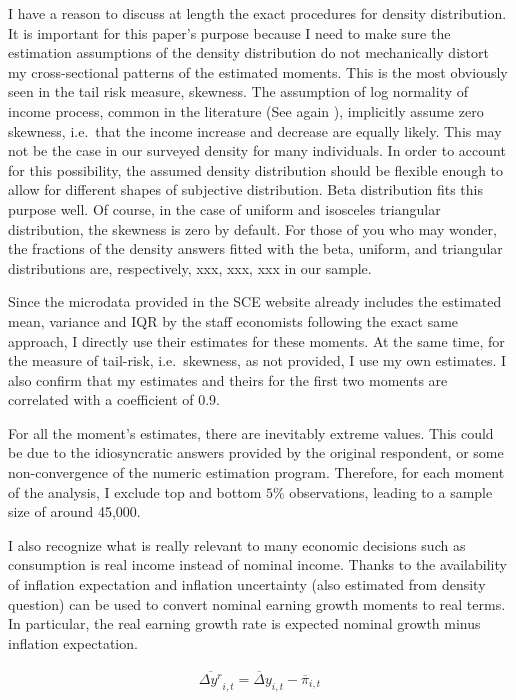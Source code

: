 \documentclass[12pt,notitlepage,onecolumn,aps,pra]{revtex4-1}
\begin{document}
I have a reason to discuss at length the exact procedures for density
distribution. It is important for this paper's purpose because I need to
make sure the estimation assumptions of the density distribution do not
mechanically distort my cross-sectional patterns of the estimated
moments. This is the most obviously seen in the tail risk measure,
skewness. The assumption of log normality of income process, common in
the literature (See again \cite{blundell_consumption_2008}), implicitly
assume zero skewness, i.e.~that the income increase and decrease are
equally likely. This may not be the case in our surveyed density for
many individuals. In order to account for this possibility, the assumed
density distribution should be flexible enough to allow for different
shapes of subjective distribution. Beta distribution fits this purpose
well. Of course, in the case of uniform and isosceles triangular
distribution, the skewness is zero by default. For those of you who may
wonder, the fractions of the density answers fitted with the beta,
uniform, and triangular distributions are, respectively, xxx, xxx, xxx
in our sample.

Since the microdata provided in the SCE website already includes the
estimated mean, variance and IQR by the staff economists following the
exact same approach, I directly use their estimates for these moments.
At the same time, for the measure of tail-risk, i.e.~skewness, as not
provided, I use my own estimates. I also confirm that my estimates and
theirs for the first two moments are correlated with a coefficient of
0.9.

For all the moment's estimates, there are inevitably extreme values.
This could be due to the idiosyncratic answers provided by the original
respondent, or some non-convergence of the numeric estimation program.
Therefore, for each moment of the analysis, I exclude top and bottom
\(5\%\) observations, leading to a sample size of around 45,000.

I also recognize what is really relevant to many economic decisions such
as consumption is real income instead of nominal income. Thanks to the
availability of inflation expectation and inflation uncertainty (also
estimated from density question) can be used to convert nominal earning
growth moments to real terms. In particular, the real earning growth
rate is expected nominal growth minus inflation expectation.

\begin{eqnarray}
\overline {\Delta y^{r}}_{i,t} = \overline\Delta y_{i,t} - \overline \pi_{i,t}
\end{eqnarray}
\end{document}
